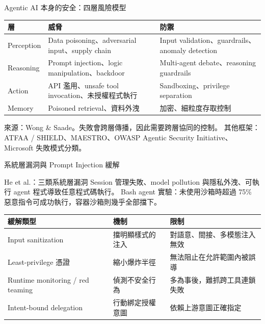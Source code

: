\documentclass[aspectratio=169]{beamer}
\newcommand{\tabsetup}{\renewcommand{\arraystretch}{1.18}}
\begin{document}
\begin{frame}{Agentic AI 本身的安全：四層風險模型}
    \tabsetup
    \footnotesize
    \begin{table}
        \centering
        \begin{tabular}{@{}l p{4.4cm} p{4.6cm}@{}}
            \toprule
            層 & 威脅 & 防禦 \\
            \midrule
            Perception & Data poisoning、adversarial input、supply chain & Input validation、guardrails、anomaly detection \\
            Reasoning & Prompt injection、logic manipulation、backdoor & Multi-agent debate、reasoning guardrails \\
            Action & API 濫用、unsafe tool invocation、未授權程式執行 & Sandboxing、privilege separation \\
            Memory & Poisoned retrieval、資料外洩 & 加密、細粒度存取控制 \\
            \bottomrule
        \end{tabular}
    \end{table}

    \small
    來源：Wong \& Saade。失敗會跨層傳播，因此需要\alert{跨層協同}的控制。
    其他框架：ATFAA / SHIELD、MAESTRO、OWASP Agentic Security Initiative、Microsoft 失敗模式分類。
\end{frame}


\begin{frame}{系統層漏洞與 Prompt Injection 緩解}
    \footnotesize
    \begin{block}{He et al.：三類系統層漏洞}
        Session 管理失敗、model pollution 與隱私外洩、可執行 agent 程式導致任意程式碼執行。
        Bash agent 實驗：未使用沙箱時超過 75\% 惡意指令可成功執行，容器沙箱則幾乎全部擋下。
    \end{block}

    \tabsetup
    \begin{tabular}{@{}l p{3.4cm} p{4.4cm}@{}}
        \toprule
        緩解類型 & 機制 & 限制 \\
        \midrule
        Input sanitization & 擋明顯樣式的注入 & 對語意、間接、多模態注入無效 \\
        Least-privilege 憑證 & 縮小爆炸半徑 & 無法阻止在允許範圍內被誤導 \\
        Runtime monitoring / red teaming & 偵測不安全行為 & 多為事後，難抓跨工具連鎖失敗 \\
        Intent-bound delegation & 行動綁定授權意圖 & 依賴上游意圖正確指定 \\
        \bottomrule
    \end{tabular}
\end{frame}
\end{document}
